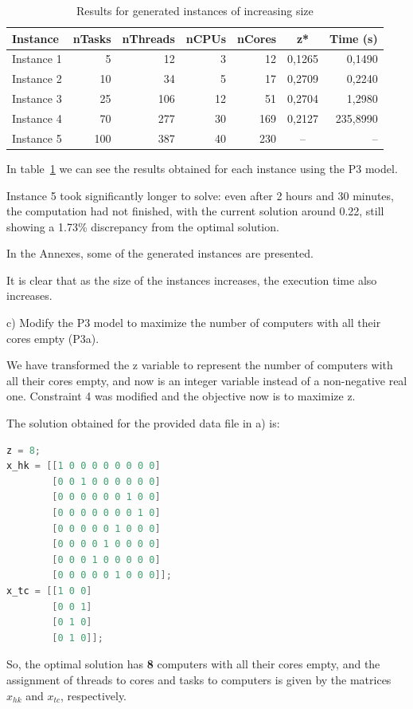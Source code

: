 \documentclass{article}
\begin{document}
\begin{table}[ht]
\centering
\caption{Results for generated instances of increasing size}
\label{tab:instances}
\small
\begin{tabular}{l r r r r c r}
\hline
Instance    & nTasks    & nThreads   & nCPUs & nCores   & z*    & Time (s) \\
\hline
Instance 1  & 5         & 12        & 3     & 12      & 0,1265    & 0,1490 \\
Instance 2  & 10        & 34        & 5     & 17      & 0,2709    & 0,2240 \\
Instance 3  & 25        & 106       & 12    & 51      & 0,2704    & 1,2980 \\
Instance 4  & 70        & 277       & 30    & 169     & 0,2127    & 235,8990 \\
Instance 5  & 100       & 387       & 40    & 230     & --        & -- \\
\hline
\end{tabular}
\end{table}

In table~\ref{tab:instances} we can see the results obtained for each instance using the P3 model.

Instance 5 took significantly longer to solve: even after 2 hours and 30 minutes, the computation had not finished, with the current solution around 0.22, still showing a 1.73\% discrepancy from the optimal solution.

In the Annexes, some of the generated instances are presented.

It is clear that as the size of the instances increases, the execution time also increases.



\begin{tcolorbox}[colback=gray!10, colframe=gray!50]
c) Modify the P3 model to maximize the number of computers with all their cores empty (P3a).
\end{tcolorbox}
We have transformed the z variable to represent the number of computers with all their cores empty, and now is an integer variable instead of a non-negative real one.
Constraint 4 was modified and the objective now is to maximize z.





The solution obtained for the provided data file in a) is:
\begin{lstlisting}[language=Java,frame=single]
z = 8;
x_hk = [[1 0 0 0 0 0 0 0 0]
        [0 0 1 0 0 0 0 0 0]
        [0 0 0 0 0 0 1 0 0]
        [0 0 0 0 0 0 0 1 0]
        [0 0 0 0 0 1 0 0 0]
        [0 0 0 0 1 0 0 0 0]
        [0 0 0 1 0 0 0 0 0]
        [0 0 0 0 0 1 0 0 0]];
x_tc = [[1 0 0]
        [0 0 1]
        [0 1 0]
        [0 1 0]];
\end{lstlisting}
So, the optimal solution has \textbf{8} computers with all their cores empty, and the assignment of threads to cores and tasks to computers is given by the matrices $x_{hk}$ and $x_{tc}$, respectively.
\end{document}
